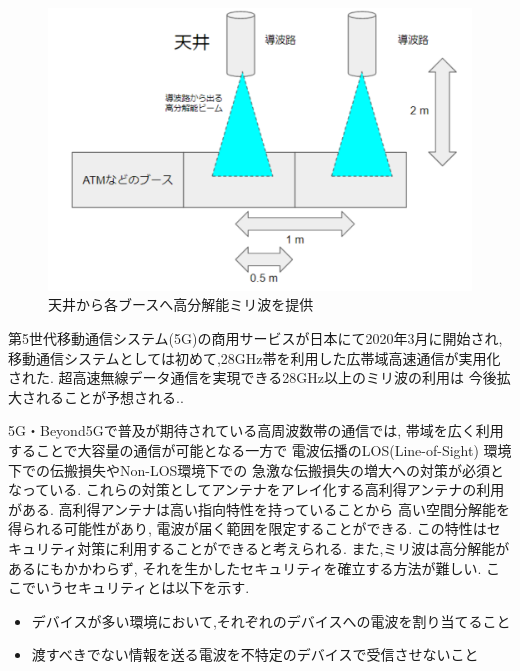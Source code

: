 \documentclass[technicalreport]{ieicej}
\begin{document}
\begin{figure}[tb]
  \vspace{20mm}
  \begin{center}
    \includegraphics[bb=0.000000 0.000000 488.318161 325.545441, width=1.0\linewidth]{img/usecase.pdf}
    \caption{天井から各ブースへ高分解能ミリ波を提供}
    \label{fig:usecase}
  \end{center}
\end{figure}


第5世代移動通信システム(5G)の商用サービスが日本にて2020年3月に開始され,
移動通信システムとしては初めて,28GHz帯を利用した広帯域高速通信が実用化された.
超高速無線データ通信を実現できる28GHz以上のミリ波の利用は
今後拡大されることが予想される.\cite{docomo_6G_white_paper}.

5G・Beyond5Gで普及が期待されている高周波数帯の通信では,
帯域を広く利用することで大容量の通信が可能となる一方で
電波伝播のLOS(Line-of-Sight)
環境下での伝搬損失やNon-LOS環境下での
急激な伝搬損失の増大への対策が必須となっている.
これらの対策としてアンテナをアレイ化する高利得アンテナの利用がある.
高利得アンテナは高い指向特性を持っていることから
高い空間分解能を得られる可能性があり,
電波が届く範囲を限定することができる.
この特性はセキュリティ対策に利用することができると考えられる.
また,ミリ波は高分解能があるにもかかわらず,
それを生かしたセキュリティを確立する方法が難しい.
ここでいうセキュリティとは以下を示す.

\begin{itemize}
  \item デバイスが多い環境において,それぞれのデバイスへの電波を割り当てること
  \item 渡すべきでない情報を送る電波を不特定のデバイスで受信させないこと
\end{itemize}
\end{document}
